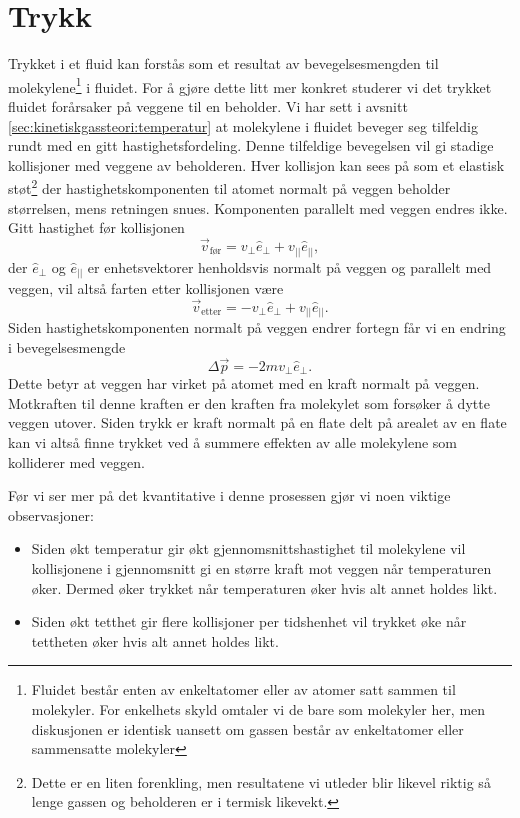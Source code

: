 \section{Trykk}
Trykket i et fluid kan forstås som et resultat av bevegelsesmengden til molekylene\footnote{Fluidet består enten av enkeltatomer eller av atomer satt sammen til molekyler. For enkelhets skyld omtaler vi de bare som molekyler her, men diskusjonen er identisk uansett om gassen består av enkeltatomer eller sammensatte molekyler} i fluidet. For å gjøre dette litt mer konkret studerer vi det  trykket fluidet forårsaker på veggene til en beholder. Vi har sett i avsnitt \ref{sec:kinetiskgassteori:temperatur} at molekylene i fluidet beveger seg tilfeldig rundt med en gitt hastighetsfordeling. Denne tilfeldige bevegelsen vil gi stadige kollisjoner med veggene av beholderen. Hver kollisjon kan sees på som et elastisk støt\footnote{Dette er en liten forenkling, men resultatene vi utleder blir likevel riktig så lenge gassen og beholderen er i termisk likevekt.} der hastighetskomponenten til atomet normalt på veggen beholder størrelsen, mens retningen snues. Komponenten parallelt med veggen endres ikke. Gitt hastighet før kollisjonen
\begin{displaymath}
	\vec{v}_\text{før} = v_\perp \hat{e}_\perp + v_{||} \hat{e}_{||},
\end{displaymath}
der $ \hat{e}_\perp$ og $\hat{e}_{||}$ er enhetsvektorer henholdsvis normalt på veggen og parallelt med veggen, vil altså farten etter kollisjonen være
\begin{displaymath}
	\vec{v}_\text{etter} = -v_\perp \hat{e}_\perp + v_{||} \hat{e}_{||}.
\end{displaymath}
Siden hastighetskomponenten normalt på veggen endrer fortegn får vi en endring i bevegelsesmengde 
\begin{displaymath}
	\Delta \vec{p} = -2mv_\perp\hat{e}_\perp.
\end{displaymath}
Dette betyr at veggen har virket på atomet med en kraft normalt på veggen. Motkraften til denne kraften er den kraften fra molekylet som forsøker å dytte veggen utover. Siden trykk er kraft normalt på en flate delt på arealet av en flate kan vi altså finne trykket ved å summere effekten av alle molekylene som kolliderer med veggen.

Før vi ser mer på det kvantitative i denne prosessen gjør vi noen viktige observasjoner:
\begin{itemize}
\item
Siden økt temperatur gir økt gjennomsnittshastighet til molekylene vil kollisjonene i gjennomsnitt gi en større kraft mot veggen når temperaturen øker. Dermed øker trykket når temperaturen øker hvis alt annet holdes likt.
\item
Siden økt tetthet gir flere kollisjoner per tidshenhet vil trykket øke når tettheten øker hvis alt annet holdes likt.
\end{itemize}

